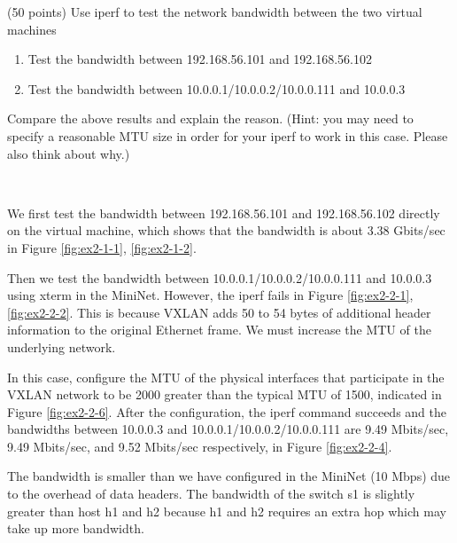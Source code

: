 \begin{exercise}[]{(50 points) Use iperf to test the network bandwidth between the two virtual machines
    \begin{enumerate}
        \item Test the bandwidth between 192.168.56.101 and 192.168.56.102
        \item Test the bandwidth between 10.0.0.1/10.0.0.2/10.0.0.111 and 10.0.0.3
    \end{enumerate}
    Compare the above results and explain the reason. (Hint: you may need to specify a reasonable MTU size in order for your iperf to work in this case. Please also think about why.)}
  \begin{solution}
  \par{~}

  We first test the bandwidth between 192.168.56.101 and 192.168.56.102 directly on the virtual machine, which shows that the bandwidth is about 3.38 Gbits/sec in Figure \ref{fig:ex2-1-1}, \ref{fig:ex2-1-2}.

  Then we test the bandwidth between 10.0.0.1/10.0.0.2/10.0.0.111 and 10.0.0.3 using xterm in the MiniNet. However, the iperf fails in Figure \ref{fig:ex2-2-1}, \ref{fig:ex2-2-2}. This is because VXLAN adds 50 to 54 bytes of additional header information to the original Ethernet frame. We must increase the MTU of the underlying network. 
  
  In this case, configure the MTU of the physical interfaces that participate in the VXLAN network to be 2000 greater than the typical MTU of 1500, indicated in Figure \ref{fig:ex2-2-6}. After the configuration, the iperf command succeeds and the bandwidths between 10.0.0.3 and 10.0.0.1/10.0.0.2/10.0.0.111 are 9.49 Mbits/sec, 9.49 Mbits/sec, and 9.52 Mbits/sec respectively, in Figure \ref{fig:ex2-2-4}. 
  
  The bandwidth is smaller than we have configured in the MiniNet (10 Mbps) due to the overhead of data headers. The bandwidth of the switch s1 is slightly greater than host h1 and h2 because h1 and h2 requires an extra hop which may take up more bandwidth.



\end{solution}
\end{exercise}
